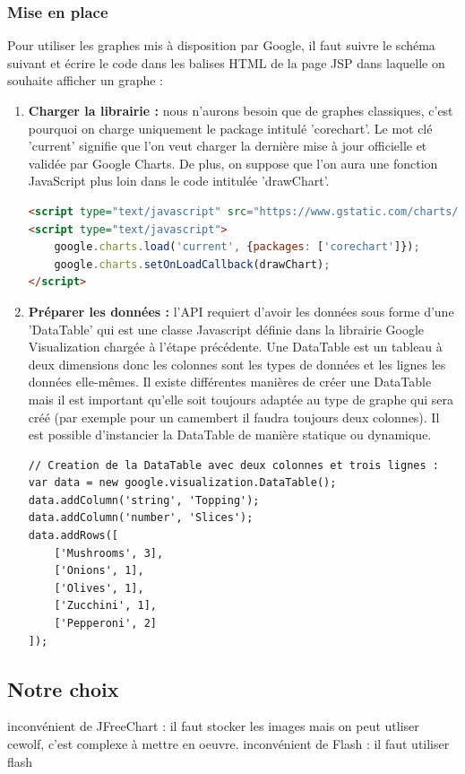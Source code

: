 \subsubsection{Mise en place}
Pour utiliser les graphes mis à disposition par Google, il faut suivre le schéma suivant et écrire le code dans les balises HTML de la page JSP dans laquelle on souhaite afficher un graphe :
\begin{enumerate}
 \item \textbf{Charger la librairie :} nous n'aurons besoin que de graphes classiques, c'est pourquoi on charge uniquement le package intitulé 'corechart'. Le mot clé 'current' signifie que l'on veut charger la dernière mise à jour officielle et validée par Google Charts. De plus, on suppose que l'on aura une fonction JavaScript plus loin dans le code intitulée 'drawChart'.
\begin{lstlisting}[language=HTML]
<script type="text/javascript" src="https://www.gstatic.com/charts/loader.js"></script>
<script type="text/javascript">
    google.charts.load('current', {packages: ['corechart']});
    google.charts.setOnLoadCallback(drawChart);
</script>
\end{lstlisting}
 \item \textbf{Préparer les données :} l'API requiert d'avoir les données sous forme d'une 'DataTable' qui est une classe Javascript définie dans la librairie Google Visualization chargée à l'étape précédente. Une DataTable est un tableau à deux dimensions donc les colonnes sont les types de données et les lignes les données elle-mêmes. Il existe différentes manières de créer une DataTable mais il est important qu'elle soit toujours adaptée au type de graphe qui sera créé (par exemple pour un camembert il faudra toujours deux colonnes). Il est possible d'instancier la DataTable de manière statique ou dynamique.
\begin{lstlisting}[language=HTML]
// Creation de la DataTable avec deux colonnes et trois lignes :
var data = new google.visualization.DataTable();
data.addColumn('string', 'Topping');
data.addColumn('number', 'Slices');
data.addRows([
    ['Mushrooms', 3],
    ['Onions', 1],
    ['Olives', 1], 
    ['Zucchini', 1],
    ['Pepperoni', 2]
]);
\end{lstlisting}
\end{enumerate}


\subsection{Notre choix}

inconvénient de JFreeChart : il faut stocker les images mais on peut utliser cewolf, c'est complexe à mettre en oeuvre.
inconvénient de Flash : il faut utiliser flash
